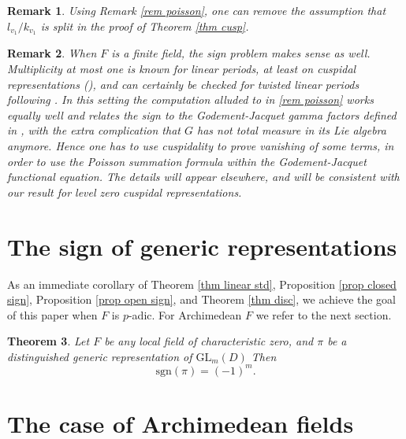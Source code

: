 \documentclass[11pt,letterpaper]{amsart}
\newcommand{\GL}{{\mathrm {GL}}} \newcommand{\PGL}{{\mathrm {PGL}}}
\theoremstyle{plain}
\newtheorem{thm}{Theorem}[section] \newtheorem{cor}[thm]{Corollary}
\newtheorem {rem}[thm]{Remark} \newtheorem{ex}[thm]{Example}
\numberwithin{equation}{section}
\newcommand{\sg}{\mathrm{sgn}}
\begin{document}
\begin{rem}
Using Remark \ref{rem poisson}, one can remove the assumption that $l_{v_1}/k_{v_1}$ is split in the proof of Theorem \ref{thm cusp}.
\end{rem}

\begin{rem}\label{rem poiscaille}
When $F$ is a finite field, the sign problem makes sense as well. Multiplicity at most one is known for linear periods, at least on cuspidal representations (\cite{Sgalois}), and can certainly be checked for twisted linear periods following \cite{G}. In this setting the computation alluded to in \ref{rem poisson} works equally well and relates the sign to the Godement-Jacquet gamma factors defined in \cite{Rgamma}, with the extra complication that $G$ has not total measure in its Lie algebra anymore. Hence one has to use cuspidality to prove vanishing of some terms, in order to use the Poisson summation formula within the Godement-Jacquet functional equation. The details will appear elsewhere, and will be consistent with our result for level zero cuspidal representations.
\end{rem}



\section{The sign of generic representations}\label{sec main}

As an immediate corollary of Theorem \ref{thm linear std}, Proposition \ref{prop closed sign}, Proposition \ref{prop open sign}, and Theorem \ref{thm disc}, we achieve the goal of this paper when $F$ is $p$-adic. For Archimedean $F$ we refer to the next section. 

\begin{thm}\label{thm gen}
Let $F$ be any local field of characteristic zero, and $\pi$ be a distinguished generic representation of $\GL_m(D)$ Then \[\sg(\pi)=(-1)^m.\] 
\end{thm}

\section{The case of Archimedean fields}\label{sec Arch}
\end{document}
